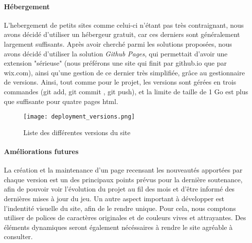         \paragraph{Hébergement}

        L'hebergement de petits sites comme celui-ci n'étant pas très contraignant,
        nous avons décidé d'utiliser un hébergeur gratuit, car ces derniers
        sont généralement largement suffisants. Après avoir cherché parmi les
        solutions proposées, nous avons décidé d'utiliser la solution 
        \textit{Github Pages}, qui permettait d'avoir une extension "sérieuse"
        (nous préférons une site qui finit par github.io que par wix.com),
        ainsi qu'une gestion de ce dernier très simplifiée, grâce au gestionnaire de versions.
        Ainsi, tout comme pour le projet, les versions sont gérées en trois commandes 
        (git add, git commit , git push), et la limite de taille de 1 Go est plus que suffisante pour quatre pages html. 


        \begin{figure}[hbt!]
            \centering
            \texttt{[image: deployment\_versions.png]}
            \caption{Liste des différentes versions du site}
        \end{figure}
        \FloatBarrier

        
        \paragraph{Améliorations futures}

        La création et la maintenance d'un page recensant les nouveautés apportées par chaque version est un des 
        principaux points prévus pour la dernière soutenance, afin de pouvoir voir l'évolution du projet au fil des 
        mois et d'être informé des dernières mises à jour du jeu. Un autre aspect important à développer est l'indentité
        visuelle du site, afin de le rendre unique. Pour cela,  nous comptons utiliser de polices de caractères originales 
        et de couleurs vives et attrayantes. Des éléments dynamiques seront également nécéssaires à rendre le site agréable 
        à consulter.